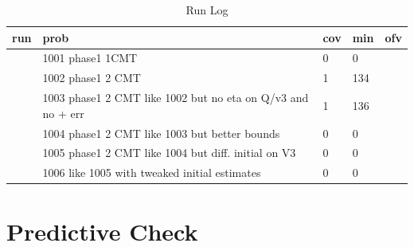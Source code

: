 \begin{table}[!htpb]
 \caption[Run Log]{Run Log \label{runlog}}
 \begin{center}
  \begin{tabular}{rlllr}
    \hline \hline
   run & prob & cov & min & ofv \\ \hline
   \verb#1001# & 1001 phase1 1CMT                                            & 0 & 0   & \verb#2526.40# \\
   \verb#1002# & 1002 phase1 2 CMT                                           & 1 & 134 & \verb#2525.97# \\
   \verb#1003# & 1003 phase1 2 CMT like 1002 but no eta on Q/v3 and no + err & 1 & 136 & \verb#2570.47# \\
   \verb#1004# & 1004 phase1 2 CMT like 1003 but better bounds               & 0 & 0   & \verb#2570.45# \\
   \verb#1005# & 1005 phase1 2 CMT like 1004 but diff. initial on V3         & 0 & 0   & \verb#2405.92# \\
   \verb#1006# & 1006 like 1005 with tweaked initial estimates               & 0 & 0   & \verb#2405.92# \\ \hline
  \end{tabular}
 \end{center}
\end{table}\section{Predictive Check}
